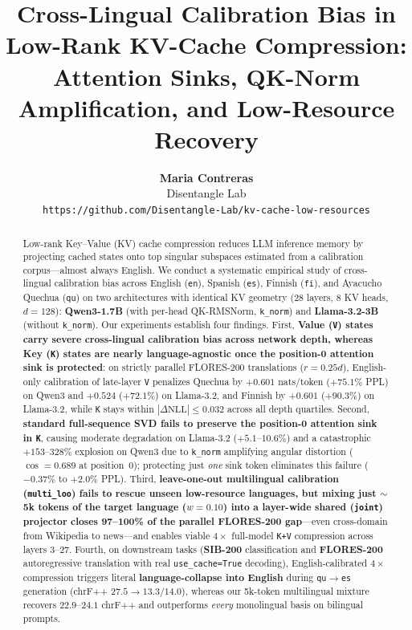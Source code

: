 \documentclass[11pt,a4paper,twocolumn]{article}
\title{\textbf{Cross-Lingual Calibration Bias in Low-Rank KV-Cache Compression:\\Attention Sinks, QK-Norm Amplification, and Low-Resource Recovery}}
\author{
  \textbf{Maria Contreras}\\
  Disentangle Lab\\
  \texttt{https://github.com/Disentangle-Lab/kv-cache-low-resources}
}
\date{}
\begin{document}
\maketitle

\begin{abstract}
Low-rank Key--Value (KV) cache compression reduces LLM inference memory by projecting cached states onto top singular subspaces estimated from a calibration corpus---almost always English. We conduct a systematic empirical study of cross-lingual calibration bias across English (\texttt{en}), Spanish (\texttt{es}), Finnish (\texttt{fi}), and Ayacucho Quechua (\texttt{qu}) on two architectures with identical KV geometry ($28$ layers, $8$ KV heads, $d=128$): \textbf{Qwen3-1.7B} (with per-head QK-RMSNorm, \texttt{k\_norm}) and \textbf{Llama-3.2-3B} (without \texttt{k\_norm}).
Our experiments establish four findings.
First, \textbf{Value (\texttt{V}) states carry severe cross-lingual calibration bias across network depth, whereas Key (\texttt{K}) states are nearly language-agnostic once the position-0 attention sink is protected}: on strictly parallel FLORES-200 translations ($r=0.25d$), English-only calibration of late-layer \texttt{V} penalizes Quechua by $+0.601$ nats/token ($+75.1\%$ PPL) on Qwen3 and $+0.524$ ($+72.1\%$) on Llama-3.2, and Finnish by $+0.601$ ($+90.3\%$) on Llama-3.2, while \texttt{K} stays within $|\Delta\text{NLL}|\le 0.032$ across all depth quartiles.
Second, \textbf{standard full-sequence SVD fails to preserve the position-0 attention sink in \texttt{K}}, causing moderate degradation on Llama-3.2 ($+5.1$--$10.6\%$) and a catastrophic $+153$--$328\%$ explosion on Qwen3 due to \texttt{k\_norm} amplifying angular distortion ($\cos=0.689$ at position~0); protecting just \emph{one} sink token eliminates this failure ($-0.37\%$ to $+2.0\%$ PPL).
Third, \textbf{leave-one-out multilingual calibration (\texttt{multi\_loo}) fails to rescue unseen low-resource languages, but mixing just $\sim$5k tokens of the target language ($w=0.10$) into a layer-wide shared (\texttt{joint}) projector closes 97--100\% of the parallel FLORES-200 gap}---even cross-domain from Wikipedia to news---and enables viable $4\times$ full-model \texttt{K+V} compression across layers 3--27.
Fourth, on downstream tasks (\textbf{SIB-200} classification and \textbf{FLORES-200} autoregressive translation with real \texttt{use\_cache=True} decoding), English-calibrated $4\times$ compression triggers literal \textbf{language-collapse into English} during \texttt{qu}$\rightarrow$\texttt{es} generation (chrF++ $27.5\rightarrow 13.3/14.0$), whereas our 5k-token multilingual mixture recovers $22.9$--$24.1$ chrF++ and outperforms \emph{every} monolingual basis on bilingual prompts.
\end{abstract}
\end{document}
